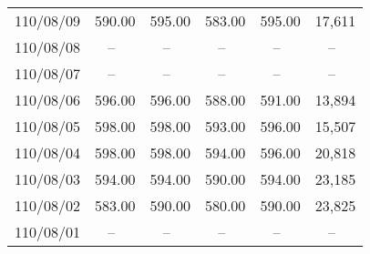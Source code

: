 \begin{longtable}{@{}cccccc@{}}
110/08/09 & 590.00    & 595.00    & 583.00    & 595.00    & 17,611    \\
\rowcolor{gray(x11gray)}
110/08/08 & --~       & --~       & --~       & --~       & --~       \\
\rowcolor{gray(x11gray)}
110/08/07 & --~       & --~       & --~       & --~       & --~       \\
110/08/06 & 596.00    & 596.00    & 588.00    & 591.00    & 13,894    \\
110/08/05 & 598.00    & 598.00    & 593.00    & 596.00    & 15,507    \\
110/08/04 & 598.00    & 598.00    & 594.00    & 596.00    & 20,818    \\
110/08/03 & 594.00    & 594.00    & 590.00    & 594.00    & 23,185    \\
110/08/02 & 583.00    & 590.00    & 580.00    & 590.00    & 23,825    \\
\rowcolor{gray(x11gray)}
110/08/01 & --~       & --~       & --~       & --~       & --~       \\

\bottomrule
\end{longtable}

